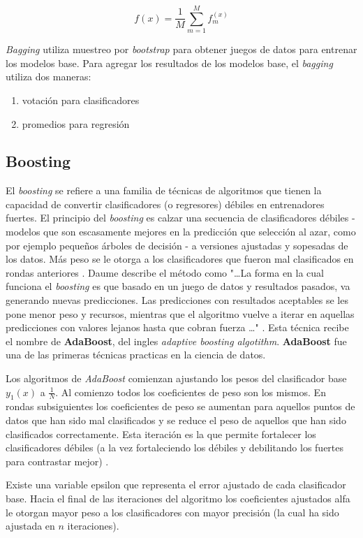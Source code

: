 \begin{spacing}{1.5}
\[ f(x) = \frac{1}{M} \sum_{m=1}^M f_m^{(x)} \]

\emph{Bagging} utiliza muestreo por \emph{bootstrap} para obtener juegos de datos para entrenar los modelos base. Para agregar los resultados de los modelos base, el \emph{bagging} utiliza dos maneras:
\begin{enumerate}
  \item votación para clasificadores
  \item promedios para regresión
\end{enumerate}

\subsection{Boosting}
El \emph{boosting} se refiere a una familia de técnicas de algoritmos que tienen la capacidad de convertir clasificadores (o regresores) débiles en entrenadores fuertes. El principio del \emph{boosting} es calzar una secuencia de clasificadores débiles - modelos que son escasamente mejores en la predicción que selección al azar, como por ejemplo pequeños árboles de decisión - a versiones ajustadas y sopesadas de los datos. Más peso se le otorga a los clasificadores que fueron mal clasificados en rondas anteriores \cite{smolyakov}. Daume describe el método como "\ldots La forma en la cual funciona el \emph{boosting} es que basado en un juego de datos y resultados pasados, va generando nuevas predicciones. Las predicciones con resultados aceptables se les pone menor peso y recursos, mientras que el algoritmo vuelve a iterar en aquellas predicciones con valores lejanos hasta que cobran fuerza \ldots" \cite{daume}. Esta técnica recibe el nombre de \textbf{AdaBoost}, del ingles \emph{adaptive boosting algotithm}. \textbf{AdaBoost} fue una de las primeras técnicas practicas en la ciencia de datos.

Los algoritmos de \emph{AdaBoost} comienzan ajustando los pesos del clasificador base \(y_1(x)\) a \(\frac{1}{N}\). Al comienzo todos los coeficientes de peso son los mismos. En rondas subsiguientes los coeficientes de peso se aumentan para aquellos puntos de datos que han sido mal clasificados y se reduce el peso de aquellos que han sido clasificados correctamente. Esta iteración es la que permite fortalecer los clasificadores débiles (a la vez fortaleciendo los débiles y debilitando los fuertes para contrastar mejor) \cite{smolyakov}. 

Existe una variable epsilon que representa el error ajustado de cada clasificador base. Hacia el final de las iteraciones del algoritmo los coeficientes ajustados alfa le otorgan mayor peso a los clasificadores con mayor precisión (la cual ha sido ajustada en \(n\) iteraciones). 


\end{spacing}
